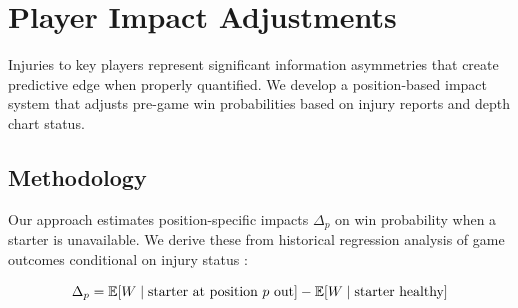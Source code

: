 
\section{Player Impact Adjustments}
\label{sec:injury-adjustments}

Injuries to key players represent significant information asymmetries that create predictive edge when properly quantified. We develop a position-based impact system that adjusts pre-game win probabilities based on injury reports and depth chart status.

\subsection{Methodology}

Our approach estimates position-specific impacts $\Delta_p$ on win probability when a starter is unavailable. We derive these from historical regression analysis of game outcomes conditional on injury status \citep{lock2014}:

\begin{equation}
\Delta_p = \mathbb{E}[W \mid \text{starter at position } p \text{ out}] - \mathbb{E}[W \mid \text{starter healthy}]
\end{equation}

